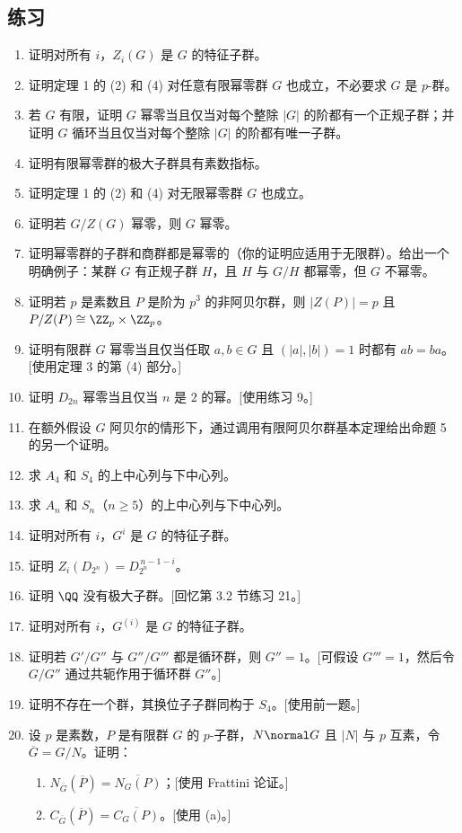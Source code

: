 \subsection*{练习}
\begin{enumerate}[label=\arabic*.]
  \item 证明对所有 $i$，$Z_i(G)$ 是 $G$ 的特征子群。
  \item 证明定理 1 的 (2) 和 (4) 对任意有限幂零群 $G$ 也成立，不必要求 $G$ 是 $p$-群。
  \item 若 $G$ 有限，证明 $G$ 幂零当且仅当对每个整除 $|G|$ 的阶都有一个正规子群；并证明 $G$ 循环当且仅当对每个整除 $|G|$ 的阶都有唯一子群。
  \item 证明有限幂零群的极大子群具有素数指标。
  \item 证明定理 1 的 (2) 和 (4) 对无限幂零群 $G$ 也成立。
  \item 证明若 $G/Z(G)$ 幂零，则 $G$ 幂零。
  \item 证明幂零群的子群和商群都是幂零的（你的证明应适用于无限群）。给出一个明确例子：某群 $G$ 有正规子群 $H$，且 $H$ 与 $G/H$ 都幂零，但 $G$ 不幂零。
  \item 证明若 $p$ 是素数且 $P$ 是阶为 $p^3$ 的非阿贝尔群，则 $|Z(P)|=p$ 且 $P/Z(P)\cong \ZZ_p\times\ZZ_p$。
  \item 证明有限群 $G$ 幂零当且仅当任取 $a,b\in G$ 且 $(|a|,|b|)=1$ 时都有 $ab=ba$。[使用定理 3 的第 (4) 部分。]
  \item 证明 $D_{2n}$ 幂零当且仅当 $n$ 是 $2$ 的幂。[使用练习 9。]
  \item 在额外假设 $G$ 阿贝尔的情形下，通过调用有限阿贝尔群基本定理给出命题 5 的另一个证明。
  \item 求 $A_4$ 和 $S_4$ 的上中心列与下中心列。
  \item 求 $A_n$ 和 $S_n$（$n\geq 5$）的上中心列与下中心列。
  \item 证明对所有 $i$，$G^i$ 是 $G$ 的特征子群。
  \item 证明 $Z_i(D_{2^n})=D_{2^n}^{\,n-1-i}$。
  \item 证明 $\QQ$ 没有极大子群。[回忆第 3.2 节练习 21。]
  \item 证明对所有 $i$，$G^{(i)}$ 是 $G$ 的特征子群。
  \item 证明若 $G'/G''$ 与 $G''/G'''$ 都是循环群，则 $G''=1$。[可假设 $G'''=1$，然后令 $G/G''$ 通过共轭作用于循环群 $G''$。]
  \item 证明不存在一个群，其换位子子群同构于 $S_4$。[使用前一题。]
  \item 设 $p$ 是素数，$P$ 是有限群 $G$ 的 $p$-子群，$N\normal G$ 且 $|N|$ 与 $p$ 互素，令 $\overline G=G/N$。证明：
  \begin{enumerate}[label=(\alph*)]
    \item $N_{\overline G}(\overline P)=\overline{N_G(P)}$；[使用 Frattini 论证。]
    \item $C_{\overline G}(\overline P)=\overline{C_G(P)}$。[使用 (a)。]
  \end{enumerate}
\end{enumerate}

